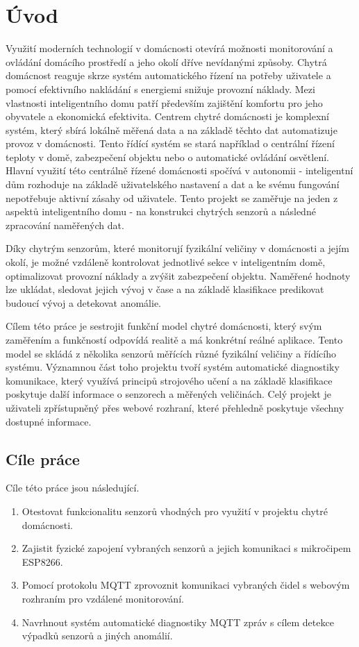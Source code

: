 \chapter{Úvod} \label{chap:introduction}
Využití moderních technologií v domácnosti otevírá možnosti monitorování a ovládání domácího prostředí a jeho okolí dříve nevídanými způsoby. Chytrá domácnost reaguje skrze systém automatického řízení na potřeby uživatele a pomocí efektivního nakládání s energiemi snižuje provozní náklady. Mezi vlastnosti inteligentního domu patří především zajištění komfortu pro jeho obyvatele a ekonomická efektivita. Centrem chytré domácnosti je komplexní systém, který sbírá lokálně měřená data a na základě těchto dat automatizuje provoz v domácnosti. Tento řídící systém se stará například o centrální řízení teploty v domě, zabezpečení objektu nebo o automatické ovládání osvětlení. Hlavní využití této centrálně řízené domácnosti spočívá v autonomii - inteligentní dům rozhoduje na základě uživatelského nastavení a dat a ke svému fungování nepotřebuje aktivní zásahy od uživatele. Tento projekt se zaměřuje na jeden z aspektů inteligentního domu - na konstrukci chytrých senzorů a následné zpracování naměřených dat. \par  
Díky chytrým senzorům, které monitorují fyzikální veličiny v domácnosti a jejím okolí, je možné vzdáleně kontrolovat jednotlivé sekce v inteligentním domě, optimalizovat provozní náklady a zvýšit zabezpečení objektu. Naměřené hodnoty lze ukládat, sledovat jejich vývoj v čase a na základě klasifikace predikovat budoucí vývoj a detekovat anomálie. \par
Cílem této práce je sestrojit funkční model chytré domácnosti, který svým zaměřením a funkčností odpovídá realitě a má konkrétní reálné aplikace. Tento model se skládá z několika senzorů měřících různé fyzikální veličiny a řídícího systému. Významnou část toho projektu tvoří systém automatické diagnostiky komunikace, který využívá principů strojového učení a na základě klasifikace poskytuje další informace o senzorech a měřených veličinách. Celý projekt je uživateli zpřístupněný přes webové rozhraní, které přehledně poskytuje všechny dostupné informace. 

\section*{Cíle práce} \label{sec:thesis_objectives}
Cíle této práce jsou následující. 

\begin{enumerate}
   \item Otestovat funkcionalitu senzorů vhodných pro využití v projektu chytré domácnosti.
   \item Zajistit fyzické zapojení vybraných senzorů a jejich komunikaci s mikročipem ESP8266.
   \item Pomocí protokolu MQTT zprovoznit komunikaci vybraných čidel s webovým rozhraním pro vzdálené monitorování.
   \item Navrhnout systém automatické diagnostiky MQTT zpráv s cílem detekce výpadků senzorů a jiných anomálií.
\end{enumerate}

